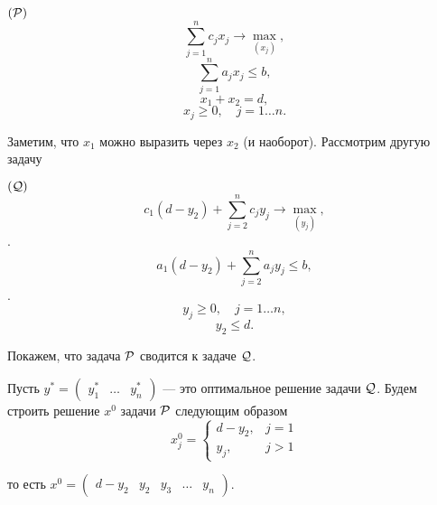 \example

$(\P)$
\[\sum_{j=1}^{n} c_j x_j \to \max_{(x_j)},\]
\[\sum_{j=1}^{n} a_j x_j \le b \tag{1},\]
\[x_1 + x_2 = d \tag{2},\]
\[x_j \ge 0, \quad j = 1\dots n. \tag{3}\]

Заметим, что $x_1$ можно выразить через $x_2$ (и наоборот). Рассмотрим другую задачу

$(\Q)$
\[c_1(d - y_2) + \sum_{j=2}^{n} c_j y_j \to \max_{(y_j)},\].
\[a_1 (d-y_2) + \sum_{j=2}^{n}a_j y_j \le b,\].
\[y_j \ge 0, \quad j = 1\dots n,\]
\[y_2 \le d.\]

Покажем, что задача $\P$ сводится к задаче $\Q$.

\prooof

Пусть $y^* = \begin{pmatrix} y^*_1 & \dots & y^*_n \end{pmatrix}$ --- это оптимальное решение задачи $\Q$. Будем строить решение $x^0$ задачи $\P$ следующим образом
\[
	x^0_j = \begin{cases}
		d - y_2,& j = 1 \\
		y_j,& j > 1
	\end{cases}
\]

то есть $x^0 = \begin{pmatrix} d - y_2 & y_2 & y_3 & \dots & y_n \end{pmatrix}$.

